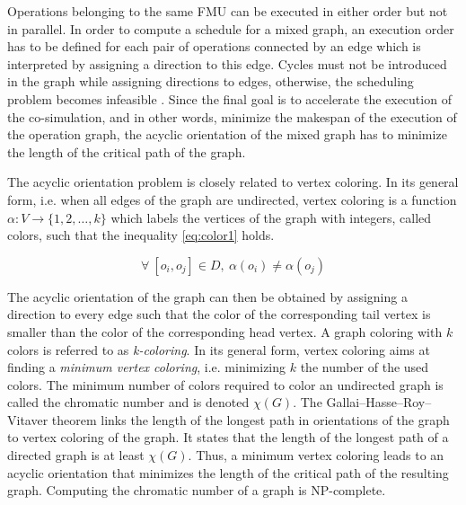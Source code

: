 Operations belonging to the same FMU can be executed in either order but not in parallel. In order to compute a schedule for a mixed graph, an execution order has to be defined for each pair of operations connected by an edge which is interpreted by assigning a direction to this edge. Cycles must not be introduced in the graph while assigning directions to edges, otherwise, the scheduling problem becomes infeasible \cite{}. Since the final goal is to accelerate the execution of the co-simulation, and in other words, minimize the makespan of the execution of the operation graph, the acyclic orientation of the mixed graph has to minimize the length of the critical path of the graph.

The acyclic orientation problem is closely related to vertex coloring. In its general form, i.e. when all edges of the graph are undirected, vertex coloring is a function $\alpha: V \rightarrow \{1, 2, \ldots, k\}$ which labels the vertices of the graph with integers, called colors, such that the inequality \ref{eq:color1} holds.

\begin{equation}
\forall\ [o_i,o_j] \in D,\ \alpha(o_i) \neq \alpha(o_j)
\label{eq:color1}
\end{equation}

The acyclic orientation of the graph can then be obtained by assigning a direction to every edge such that the color of the corresponding tail vertex is smaller than the color of the corresponding head vertex. A graph coloring with $k$ colors is referred to as \textit{k-coloring}. In its general form, vertex coloring aims at finding a \textit{minimum vertex coloring}, i.e. minimizing $k$ the number of the used colors. The minimum number of colors required to color an undirected graph is called the chromatic number and is denoted $\chi(G)$. The Gallai–Hasse–Roy–Vitaver theorem \cite{gallai:1968,roy:1967,hasse:1966,vitaver:1962} links the length of the longest path in orientations of the graph to vertex coloring of the graph. It states that the length of the longest path of a directed graph is at least $\chi(G)$. Thus, a minimum vertex coloring leads to an acyclic orientation that minimizes the length of the critical path of the resulting graph. Computing the chromatic number of a graph is NP-complete.

